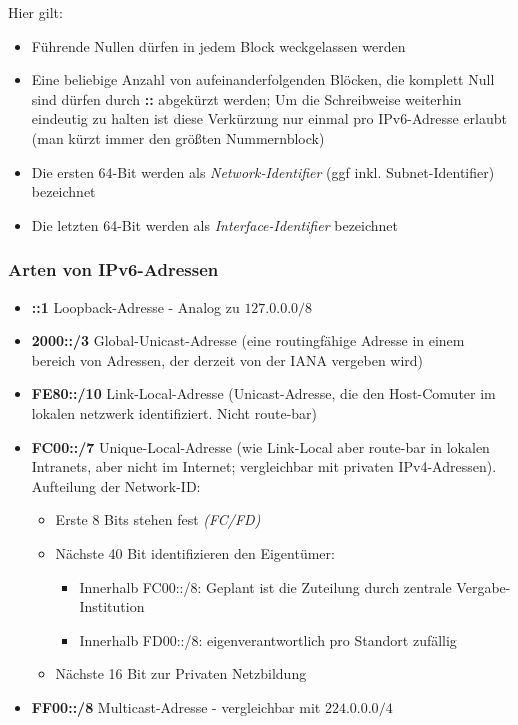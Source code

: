\documentclass[a4paper, 12pt]{report}
\begin{document}
\begin{multicols}{2}
Hier gilt:
\begin{itemize}
	\item Führende Nullen dürfen in jedem Block weckgelassen werden
	\item Eine beliebige Anzahl von aufeinanderfolgenden Blöcken, die
		komplett Null sind dürfen durch \textbf{::} abgekürzt werden;
		Um die Schreibweise weiterhin eindeutig zu halten ist diese
		Verkürzung nur einmal pro IPv6-Adresse erlaubt (man kürzt immer
		den größten Nummernblock)
	\item Die ersten 64-Bit werden als \emph{Network-Identifier} (ggf inkl.
		Subnet-Identifier) bezeichnet
	\item Die letzten 64-Bit werden als \emph{Interface-Identifier}
		bezeichnet
\end{itemize}

\subsubsection{Arten von IPv6-Adressen}

\begin{itemize}
	\item \textbf{::1} Loopback-Adresse - Analog zu $127.0.0.0/8$
	\item \textbf{2000::/3} Global-Unicast-Adresse (eine routingfähige
		Adresse in einem bereich von Adressen, der derzeit von der IANA
		vergeben wird)
	\item \textbf{FE80::/10} Link-Local-Adresse (Unicast-Adresse, die den
		Host-Comuter im lokalen netzwerk identifiziert. Nicht route-bar)
	\item \textbf{FC00::/7} Unique-Local-Adresse (wie Link-Local aber
		route-bar in lokalen Intranets, aber nicht im Internet;
		vergleichbar mit privaten IPv4-Adressen). Aufteilung der
		Network-ID:
	\begin{itemize}
		\item Erste 8 Bits stehen fest \emph{(FC/FD)}
		\item Nächste 40 Bit identifizieren den Eigentümer:
		\begin{itemize}
			\item Innerhalb FC00::/8: Geplant ist die
				Zuteilung durch zentrale Vergabe-
				Institution
			\item Innerhalb FD00::/8: eigenverantwortlich
				pro Standort zufällig
		\end{itemize}
		\item Nächste 16 Bit zur Privaten Netzbildung
	\end{itemize}
	\item \textbf{FF00::/8} Multicast-Adresse - vergleichbar mit
		$224.0.0.0/4$
\end{itemize}


\end{multicols}
\end{document}
